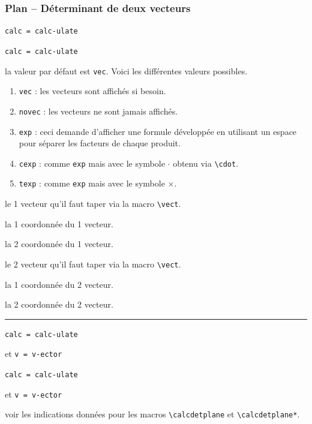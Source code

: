 \documentclass[12pt,a4paper]{book}
\newcommand\env[1]{\texttt{#1}}
\newcommand\macro[1]{\env{\textbackslash{}#1}}
\theoremstyle{definition}
\newcommand\separation{
	\medskip
	\hfill\rule{0.5\textwidth}{0.75pt}\hfill
	\medskip
}
\newcommand\mwhyprefix[2]{%
	\texttt{#1 = #1-#2}%
}
\begin{document}
{{\subsubsection{Plan -- Déterminant de deux vecteurs} \label{tnsgeo-colinearity-criteria}



 \hfill \mwhyprefix{calc}{ulate}

 \hfill \mwhyprefix{calc}{ulate}


\IDoption{} la valeur par défaut est \verb+vec+. Voici les différentes valeurs possibles.
\begin{enumerate}
	\item \verb+vec+ : les vecteurs sont affichés si besoin.

	\item \verb+novec+ : les vecteurs ne sont jamais affichés.

	\item \verb+exp+ : ceci demande d'afficher une formule développée en utilisant un espace pour séparer les facteurs de chaque produit.

	\item \verb+cexp+ : comme \verb+exp+ mais avec le symbole $\cdot$ obtenu via \macro{cdot}.

	\item \verb+texp+ : comme \verb+exp+ mais avec le symbole $\times$.
\end{enumerate}


 le 1\ier{} vecteur qu'il faut taper via la macro \macro{vect}.

 la 1\iere{} coordonnée du 1\ier{} vecteur.

 la 2\ieme{} coordonnée du 1\ier{} vecteur.

 le 2\ieme{} vecteur qu'il faut taper via la macro \macro{vect}.

 la 1\iere{} coordonnée du 2\ieme{} vecteur.

 la 2\ieme{} coordonnée du 2\ieme{} vecteur.


\separation


 \hfill \mwhyprefix{calc}{ulate}
                                   et \mwhyprefix{v}{ector}

 \hfill \mwhyprefix{calc}{ulate}
                                   et \mwhyprefix{v}{ector}


\IDoption{} voir les indications données pour les macros \macro{calcdetplane} et \macro{calcdetplane*}.

}}
\end{document}
